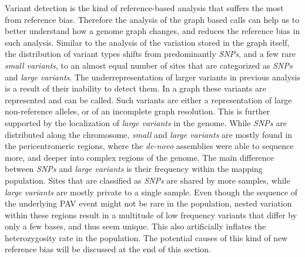 Variant detection is the kind of reference-based analysis that suffers the most from reference bias. Therefore the analysis of the graph based calls can help us to better understand how a genome graph changes, and reduces the reference bias in such analysis. Similar to the analysis of the variation stored in the graph itself, the distribution of variant types shifts from predominantly \textit{SNPs}, and a few rare \textit{small variants}, to an almost equal number of sites that are categorized as \textit{SNPs} and \textit{large variants}. The underrepresentation of larger variants in previous analysis is a result of their inability to detect them. In a graph these variants are represented and can be called. Such variants are either a representation of large non-reference alleles, or of an incomplete graph resolution. This is further supported by the localization of \textit{large variants} in the genome. While \textit{SNPs} are distributed along the chromosome, \textit{small} and \textit{large variants} are mostly found in the pericentromeric regions, where the \textit{de-novo} assemblies were able to sequence more, and deeper into complex regions of the genome. The main difference between \textit{SNPs} and \textit{large variants} is their frequency within the mapping population. Sites that are classified as \textit{SNPs} are shared by more samples, while \textit{large variants} are mostly private to a single sample. Even though the sequence of the underlying PAV event might not be rare in the population, nested variation within these regions result in a multitude of low frequency variants that differ by only a few bases, and thus seem unique. This also artificially inflates the heterozygosity rate in the population. The potential causes of this kind of new reference bias will be discussed at the end of this section. \newline
